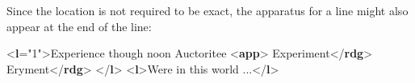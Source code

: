 Since the location is not required to be exact, the apparatus for a line might also appear at the end of the line: \par\bgroup{}\exampleFont \begin{shaded}\noindent\mbox{}{<\textbf{l}\hspace*{1em}{n}="{1}">}Experience though noon Auctoritee\mbox{}\newline 
{<\textbf{app}>}\mbox{}\newline 
\hspace*{1em} Experiment{</\textbf{rdg}>}\mbox{}\newline 
\hspace*{1em} Eryment{</\textbf{rdg}>}\mbox{}\newline 
{}\mbox{}\newline 
{</\textbf{l}>}\mbox{}\newline 
{<\textbf{l}>}Were in this world ...{</\textbf{l}>}\end{shaded}\egroup\par \par
